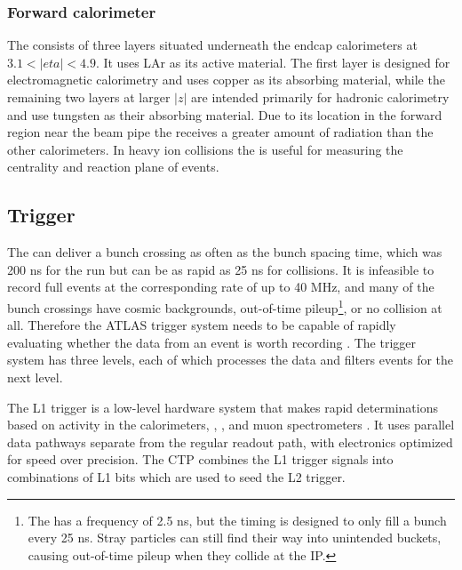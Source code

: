 \subsubsection{Forward calorimeter}
The \fcal consists of three layers situated underneath the endcap calorimeters at $3.1 < |eta| < 4.9$.
It uses \ac{LAr} as its active material.
The first layer is designed for electromagnetic calorimetry and uses copper as its absorbing material, while the remaining two layers at larger $|z|$ are intended primarily for hadronic calorimetry and use tungsten as their absorbing material.
Due to its location in the forward region near the beam pipe the \fcal receives a greater amount of radiation than the other calorimeters.
In heavy ion collisions the \fcal is useful for measuring the centrality and reaction plane of events.

\subsection{Trigger}
\label{subsec:atlas_trigger} %

The \lhc can deliver a bunch crossing as often as the bunch spacing time, which was 200 ns for the \pPb run but can be as rapid as 25 ns for \pp collisions.
It is infeasible to record full events at the corresponding rate of up to 40 MHz, and many of the bunch crossings have cosmic backgrounds, out-of-time pileup\footnote{The \lhc \rf has a frequency of 2.5 ns, but the timing is designed to only fill a bunch every 25 ns. Stray particles can still find their way into unintended \rf buckets, causing out-of-time pileup when they collide at the \ac{IP}.}, or no collision at all.
Therefore the ATLAS trigger system needs to be capable of rapidly evaluating whether the data from an event is worth recording \cite{Aad:2012xs}. %
The trigger system has three levels, each of which processes the data and filters events for the next level.

The \ac{L1} trigger is a low-level hardware system that makes rapid determinations based on activity in the calorimeters, \mbts, \zdc, and muon spectrometers \cite{ATLAS:1998ad}.
It uses parallel data pathways separate from the regular readout path, with electronics optimized for speed over precision.
The \ac{CTP} combines the \ac{L1} trigger signals into combinations of \ac{L1} bits which are used to seed the \ac{L2} trigger.

